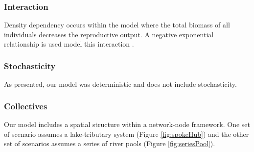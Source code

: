 \documentclass{article}[12pt]
\begin{document}
\subsubsection{Interaction}

Density dependency occurs within the model where the total biomass of all individuals decreases the reproductive output.  
A negative exponential relationship is used model this interaction \citep{bolker2008ecological}. 


\subsubsection{Stochasticity}\label{stoc}

As presented, our model was deterministic and does not include stochasticity. 



\subsubsection{Collectives}

Our model includes a spatial structure within a network-node framework.
One set of scenario assumes a lake-tributary system (Figure \ref{fig:spokeHub}) and the other set of scenarios assumes a series of river pools (Figure \ref{fig:seriesPool}).
\end{document}
